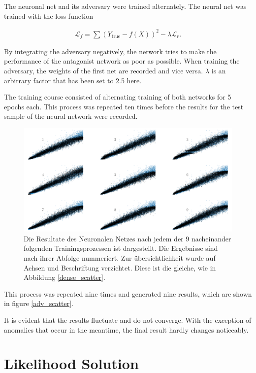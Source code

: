 \documentclass[12pt, a4paper]{thesis}
\begin{document}
The neuronal net and its adversary were trained alternately. The
neural net was trained with the loss function

\begin{align}
\mathcal{L}_f = \sum (Y_{\text{true}} - f(X))^2 - \lambda \mathcal{L}_r.
\end{align}

By integrating the adversary negatively, the network tries to make the
performance of the antagonist network as poor as possible. When
training the adversary, the weights of the first net are recorded and
vice versa. \(\lambda\) is an arbitrary factor that has been set to 2.5
here.

The training course consisted of alternating training of both networks
for 5 epochs each. This process was repeated ten times before the
results for the test sample of the neural network were recorded.

\begin{figure}[htbp]
\centering
\includegraphics[width=.9\linewidth]{../images/adv_scatter.png}
\caption{\label{fig:org059dd37}
Die Resultate des Neuronalen Netzes nach jedem der 9 nacheinander folgenden Trainingsprozessen ist dargestellt. Die Ergebnisse sind nach ihrer Abfolge nummeriert. Zur übersichtlichkeit wurde auf Achsen und Beschriftung verzichtet. Diese ist die gleiche, wie in Abbildung \ref{dense_scatter}.}
\end{figure}

This process was repeated nine times and generated nine results, which
are shown in figure \ref{adv_scatter}.

It is evident that the results fluctuate and do not converge. With
the exception of anomalies that occur in the meantime, the final
result hardly changes noticeably.

\section{Likelihood Solution}
\label{sec:org05c2ceb}
\end{document}
